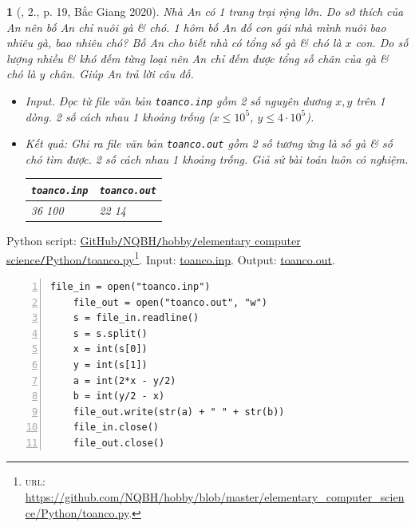 \documentclass{article}
\newtheorem{baitoan}{}
\begin{document}
\begin{baitoan}[\cite{VietSTEM2021}, 2., p. 19, Bắc Giang 2020]
	Nhà An có 1 trang trại rộng lớn. Do sở thích của An nên bố An chỉ nuôi gà \& chó. 1 hôm bố An đố con gái nhà mình nuôi bao nhiêu gà, bao nhiêu chó? Bố An cho biết nhà có tổng số gà \& chó là $x$ con. Do số lượng nhiều \& khó đếm từng loại nên An chỉ đếm được tổng số chân của gà \& chó là $y$ chân. Giúp An trả lời câu đố.
	\begin{itemize}
		\item {\sf Input.} Đọc từ file văn bản \verb|toanco.inp| gồm 2 số nguyên dương $x,y$ trên 1 dòng. 2 số cách nhau 1 khoảng trống ($x\le10^5$, $y\le4\cdot10^5$).
		\item {\sf Kết quả:} Ghi ra file văn bản \verb|toanco.out| gồm 2 số tương ứng là số gà \& số chó tìm được. 2 số cách nhau 1 khoảng trống. Giả sử bài toán luôn có nghiệm.
		\begin{table}[H]
			\centering
			\begin{tabular}{|l|l|}
				\hline
				{\tt toanco.inp} & {\tt toanco.out} \\
				\hline
				36 100 & 22 14 \\
				\hline
			\end{tabular}
		\end{table}
	\end{itemize}
\end{baitoan}
Python script: \href{https://github.com/NQBH/hobby/blob/master/elementary_computer_science/Python/toanco.py}{GitHub{\tt/}NQBH{\tt/}hobby{\tt/}elementary computer science{\tt/}Python{\tt/}toanco.py}\footnote{\textsc{url}: \url{https://github.com/NQBH/hobby/blob/master/elementary_computer_science/Python/toanco.py}.}. Input: \href{https://github.com/NQBH/hobby/blob/master/elementary_computer_science/Python/toanco.inp}{toanco.inp}. Output: \href{https://github.com/NQBH/hobby/blob/master/elementary_computer_science/Python/toanco.out}{toanco.out}.
\begin{Verbatim}[numbers=left,xleftmargin=5mm]
	file_in = open("toanco.inp")
	file_out = open("toanco.out", "w")
	s = file_in.readline()
	s = s.split()
	x = int(s[0])
	y = int(s[1])
	a = int(2*x - y/2)
	b = int(y/2 - x)
	file_out.write(str(a) + " " + str(b))
	file_in.close()
	file_out.close()
\end{Verbatim}
\end{document}
